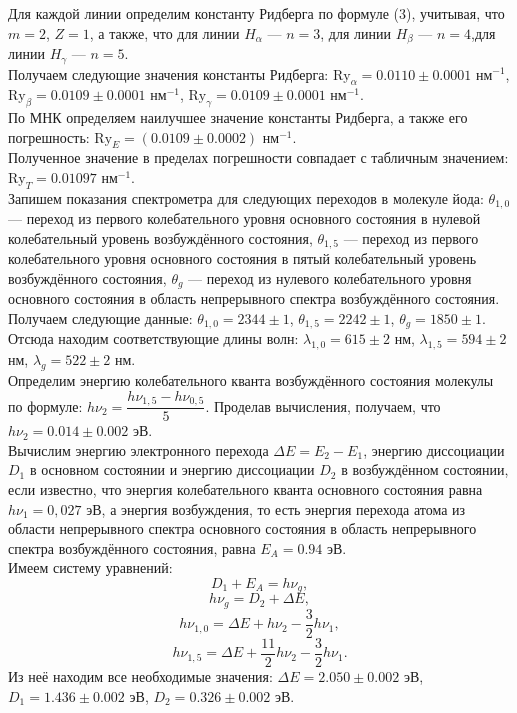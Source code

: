 \documentclass[a4paper, 12pt]{article}
\begin{document}
Для каждой линии определим константу Ридберга по формуле (3), учитывая, что $m=2$, $Z=1$, а также, что для линии $H_{\alpha}$ --- $n=3$, для линии $H_{\beta}$ --- $n=4$,для линии $H_{\gamma}$ --- $n=5$.\\
Получаем следующие значения константы Ридберга: $\text{Ry}_{\alpha}=0.0110 \pm 0.0001$ нм$^{-1}$, $\text{Ry}_{\beta}=0.0109 \pm 0.0001$ нм$^{-1}$, $\text{Ry}_{\gamma}=0.0109 \pm 0.0001$ нм$^{-1}$.\\
По МНК определяем наилучшее значение константы Ридберга, а также его погрешность: $\text{Ry}_E=(0.0109\pm 0.0002)$ нм$^{-1}$.\\
Полученное значение в пределах погрешности совпадает с табличным значением: $\text{Ry}_T=0.01097$ нм$^{-1}$.\\
Запишем показания спектрометра для следующих переходов в молекуле йода: $\theta_{1,0}$ --- переход из первого колебательного уровня основного состояния в нулевой колебательный уровень возбуждённого состояния,  $\theta_{1,5}$ --- переход из первого колебательного уровня основного состояния в пятый колебательный уровень возбуждённого состояния, $\theta_{g}$ --- переход из нулевого колебательного уровня основного состояния в область непрерывного спектра возбуждённого состояния.\\
Получаем следующие данные: $\theta_{1,0}=2344 \pm 1$, $\theta_{1,5}=2242 \pm 1$, $\theta_g=1850 \pm 1$. Отсюда находим соответствующие длины волн: $\lambda_{1,0}=615 \pm 2$ нм, $\lambda_{1,5}=594 \pm 2$ нм, $\lambda_g=522 \pm 2$ нм.\\
Определим энергию колебательного кванта возбуждённого состояния молекулы по формуле: $h \nu_2=\dfrac{h\nu_{1,5}-h \nu_{0,5}}{5}$. Проделав вычисления, получаем, что $h\nu_2=0.014\pm 0.002$ эВ.\\
Вычислим энергию электронного перехода $\Delta E=E_2-E_1$, энергию диссоциации $D_1$ в основном состоянии и энергию диссоциации $D_2$ в возбуждённом состоянии, если известно, что энергия колебательного кванта основного состояния равна $h\nu_1=0,027$ эВ, а энергия возбуждения, то есть энергия перехода атома из области непрерывного спектра основного состояния в область непрерывного спектра возбуждённого состояния, равна $E_A=0.94$ эВ.\\
Имеем систему уравнений:
\begin{equation}
D_1+E_A=h \nu_g,
\end{equation}
\begin{equation}
h\nu_g=D_2+\Delta E,
\end{equation}
\begin{equation}
h\nu_{1,0}=\Delta E+h\nu_2-\dfrac{3}{2}h\nu_1,
\end{equation}
\begin{equation}
h\nu_{1,5}=\Delta E+\dfrac{11}{2}h\nu_2-\dfrac{3}{2}h\nu_1.
\end{equation}
Из неё находим все необходимые значения: $\Delta E=2.050\pm 0.002$ эВ, $D_1=1.436\pm 0.002$ эВ, $D_2=0.326 \pm 0.002$ эВ.
\end{document}
